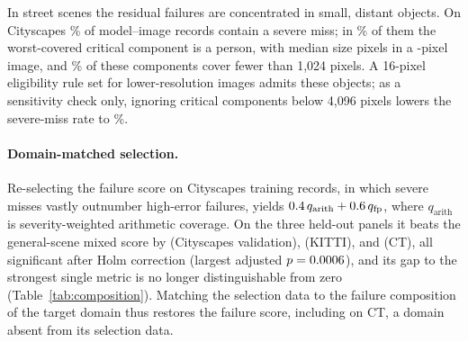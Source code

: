 In street scenes the residual failures are concentrated in small, distant
objects. On Cityscapes \NCitySevere\% of model--image records contain a severe
miss; in \NCityPersonShare\% of them the worst-covered critical component is a
person, with median size \NCityCulpritMedian{} pixels in a
\NCityImagePixels-pixel image, and \NCityCulpritBelowK\% of these components
cover fewer than 1,024 pixels. A 16-pixel eligibility rule set for
lower-resolution images admits these objects; as a sensitivity check only,
ignoring critical components below 4,096 pixels lowers the severe-miss rate to
\NCitySevereIgnoreFourK\%.

\paragraph{Domain-matched selection.} Re-selecting the failure score on
Cityscapes training records, in which severe misses vastly outnumber high-error
failures, yields $0.4\,q_{\mathrm{arith}}+0.6\,q_{\mathrm{fp}}$,
where $q_{\mathrm{arith}}$ is severity-weighted arithmetic coverage. On the three
held-out panels it beats the general-scene mixed score by \NSelGainCity{}
(Cityscapes validation), \NSelGainKitti{} (KITTI), and \NSelGainAmos{} (CT), all
significant after Holm correction (largest adjusted $p=0.0006$), and its
gap to the strongest single metric is no longer distinguishable from zero
(Table~\ref{tab:composition}). Matching the selection data to the failure
composition of the target domain thus restores the failure score, including on
CT, a domain absent from its selection data.
